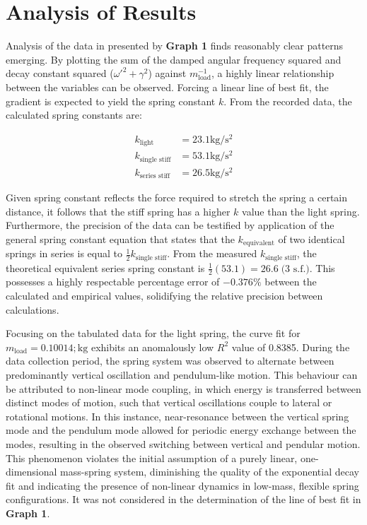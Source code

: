 \section{Analysis of Results}

Analysis of the data in presented by \textbf{Graph 1} finds reasonably clear patterns emerging. By plotting the sum of the damped angular frequency squared and decay constant squared ($\omega'^2 + \gamma^2$) against $m_{\text{load}}^{-1}$, a highly linear relationship between the variables can be observed. Forcing a linear line of best fit, the gradient is expected to yield the spring constant $k$. From the recorded data, the calculated spring constants are:

\vspace{-1em}

\begin{align*}
k_{\text{light}} &= 23.1 \si{\kilo\gram\per\second\squared} \\
k_{\text{single stiff}} &= 53.1 \si{\kilo\gram\per\second\squared} \\
k_{\text{series stiff}} &= 26.5 \si{\kilo\gram\per\second\squared}
\end{align*}

Given spring constant reflects the force required to stretch the spring a certain distance, it follows that the stiff spring has a higher $k$ value than the light spring. Furthermore, the precision of the data can be testified by application of the general spring constant equation that states that the $k_{\text{equivalent}}$ of two identical springs in series is equal to $\tfrac{1}{2}k_{\text{single stiff}}$. From the measured $k_{\text{single stiff}}$, the theoretical equivalent series spring constant is \linebreak$\tfrac{1}{2} \left( 53.1 \right) = 26.6 \; \text{(3 s.f.)}$. This possesses a highly respectable percentage error of $- 0.376 \%$ between the calculated and empirical values, solidifying the relative precision between calculations.

Focusing on the tabulated data for the light spring, the curve fit for $m_{\text{load}} = 0.10014 ; \si{\kilo\gram}$ exhibits an anomalously low $R^2$ value of 0.8385. During the data collection period, the spring system was observed to alternate between predominantly vertical oscillation and pendulum-like motion. This behaviour can be attributed to non-linear mode coupling, in which energy is transferred between distinct modes of motion, such that vertical oscillations couple to lateral or rotational motions. In this instance, near-resonance between the vertical spring mode and the pendulum mode allowed for periodic energy exchange between the modes, resulting in the observed switching between vertical and pendular motion. This phenomenon violates the initial assumption of a purely linear, one-dimensional mass-spring system, diminishing the quality of the exponential decay fit and indicating the presence of non-linear dynamics in low-mass, flexible spring configurations. It was not considered in the determination of the line of best fit in \textbf{Graph 1}.

